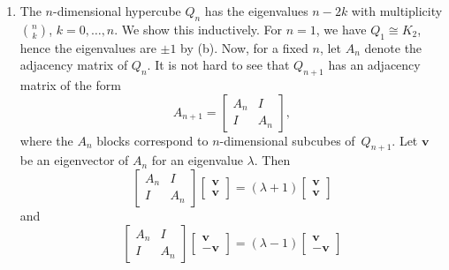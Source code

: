 \begin{example}
\begin{enumerate}
        \item[(e)] The $n$-dimensional hypercube $Q_n$ has the eigenvalues $n - 2k$ with multiplicity $\binom{n}{k}$, $k = 0, \dots, n$. 
            We show this inductively. For $n = 1$, we have $Q_1 \cong K_2$, hence the eigenvalues are $\pm 1$ by (b).
            Now, for a fixed $n$, let $A_n$ denote the adjacency matrix of $Q_n$. 
            It is not hard to see that $Q_{n + 1}$ has an adjacency matrix of the form 
            \begin{equation*}
                A_{n + 1} = \begin{bmatrix}
                    A_n & I \\ 
                    I & A_n 
                \end{bmatrix},
            \end{equation*}
            where the $A_n$ blocks correspond to $n$-dimensional subcubes \mbox{of $Q_{n + 1}$}.
            Let $\bm{v}$ be an eigenvector of $A_n$ for an eigenvalue $\lambda$. Then
            \begin{equation*}
                \begin{bmatrix}
                    A_n & I \\ 
                    I & A_n 
                \end{bmatrix}
                \begin{bmatrix}
                    \bm{v} \\ \bm{v} 
                \end{bmatrix}
                = (\lambda + 1)
                \begin{bmatrix}
                    \bm{v} \\\bm{v} 
                \end{bmatrix}
            \end{equation*}
            and 
            \begin{equation*}
                \begin{bmatrix}
                    A_n & I \\ 
                    I & A_n 
                \end{bmatrix}
                \begin{bmatrix}
                    \bm{v} \\ -\bm{v} 
                \end{bmatrix}
                = (\lambda - 1)
                \begin{bmatrix}
                    \bm{v} \\ -\bm{v} 

\end{bmatrix}
\end{equation*}
\end{enumerate}
\end{example}
